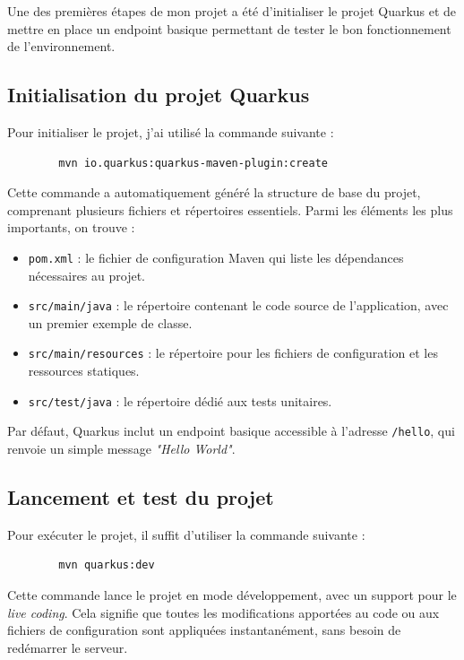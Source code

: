 \documentclass{article}
\begin{document}
	Une des premières étapes de mon projet a été d’initialiser le projet Quarkus et de mettre en place un endpoint basique permettant de tester le bon fonctionnement de l’environnement.
	
	\subsection{Initialisation du projet Quarkus}
	
	Pour initialiser le projet, j’ai utilisé la commande suivante :
	\begin{verbatim}
		mvn io.quarkus:quarkus-maven-plugin:create
	\end{verbatim}
	
	Cette commande a automatiquement généré la structure de base du projet, comprenant plusieurs fichiers et répertoires essentiels. Parmi les éléments les plus importants, on trouve :
	\begin{itemize}
		\item \texttt{pom.xml} : le fichier de configuration Maven qui liste les dépendances nécessaires au projet.
		\item \texttt{src/main/java} : le répertoire contenant le code source de l’application, avec un premier exemple de classe.
		\item \texttt{src/main/resources} : le répertoire pour les fichiers de configuration et les ressources statiques.
		\item \texttt{src/test/java} : le répertoire dédié aux tests unitaires.
	\end{itemize}
	
	Par défaut, Quarkus inclut un endpoint basique accessible à l’adresse \texttt{/hello}, qui renvoie un simple message \textit{"Hello World"}.
	
	\subsection{Lancement et test du projet}
	
	Pour exécuter le projet, il suffit d’utiliser la commande suivante :
	\begin{verbatim}
		mvn quarkus:dev
	\end{verbatim}
	
	Cette commande lance le projet en mode développement, avec un support pour le \textit{live coding}. Cela signifie que toutes les modifications apportées au code ou aux fichiers de configuration sont appliquées instantanément, sans besoin de redémarrer le serveur.
	
\end{document}
